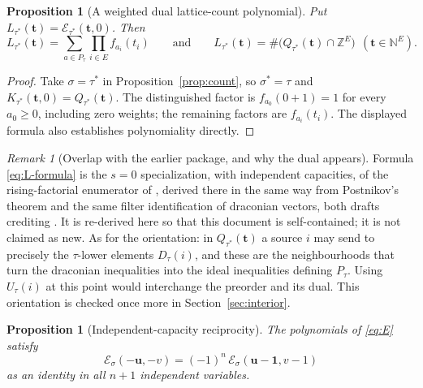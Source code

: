 \documentclass[11pt]{article}
\numberwithin{equation}{section}
\newtheorem{proposition}[theorem]{Proposition}
\theoremstyle{definition}
\theoremstyle{remark}
\newtheorem{remark}[theorem]{Remark}
\newcommand{\N}{\mathbb N}
\newcommand{\Z}{\mathbb Z}
\newcommand{\one}{\mathbf 1}
\newcommand{\Ecal}{\mathcal E}
\begin{document}
\begin{proposition}[A weighted dual lattice-count polynomial]
\label{prop:weighted}
Put $L_{\tau^*}(\mathbf t)=\Ecal_{\tau^*}(\mathbf t,0)$. Then
\begin{equation}
 \boxed{\displaystyle
 L_{\tau^*}(\mathbf t)=\sum_{a\in P_\tau}\prod_{i\in E} f_{a_i}(t_i)}
 \qquad\text{and}\qquad
 L_{\tau^*}(\mathbf t)=\#\bigl(Q_{\tau^*}(\mathbf t)\cap\Z^E\bigr)
 \ \ (\mathbf t\in\N^E).
 \label{eq:L-formula}
\end{equation}
\end{proposition}

\begin{proof}
Take $\sigma=\tau^*$ in Proposition~\ref{prop:count}, so $\sigma^*=\tau$ and
$K_{\tau^*}(\mathbf t,0)=Q_{\tau^*}(\mathbf t)$. The distinguished factor is
$f_{a_0}(0+1)=1$ for every $a_0\ge0$, including zero weights; the remaining
factors are $f_{a_i}(t_i)$. The displayed formula also establishes
polynomiality directly.
\end{proof}

\begin{remark}[Overlap with the earlier package, and why the dual appears]
\label{rem:prior-enumerator}
Formula \eqref{eq:L-formula} is the $s=0$ specialization, with independent
capacities, of the rising-factorial enumerator of \cite{PriorReciprocity},
derived there in the same way from Postnikov's theorem and the same filter
identification of draconian vectors, both drafts crediting
\cite[Lemma~4.1]{AC}. It is re-derived here so that this document is
self-contained; it is not claimed as new. As for the orientation: in
$Q_{\tau^*}(\mathbf t)$ a source $i$ may send to precisely the $\tau$-lower
elements $D_\tau(i)$, and these are the neighbourhoods that turn the
draconian inequalities into the ideal inequalities defining $P_\tau$. Using
$U_\tau(i)$ at this point would interchange the preorder and its dual. This
orientation is checked once more in Section~\ref{sec:interior}.
\end{remark}

\begin{proposition}[Independent-capacity reciprocity]
\label{prop:reciprocity}
The polynomials of \eqref{eq:E} satisfy
\begin{equation}
 \Ecal_\sigma(-\mathbf u,-v)=(-1)^n\,\Ecal_\sigma(\mathbf u-\one,v-1)
 \label{eq:reciprocity}
\end{equation}
as an identity in all $n+1$ independent variables.
\end{proposition}
\end{document}
